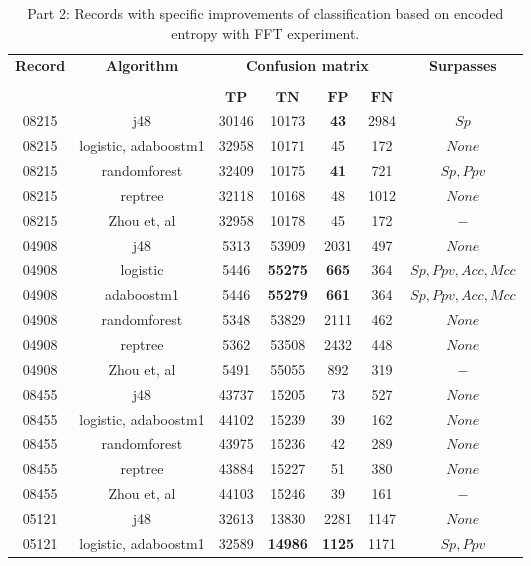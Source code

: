 \begin{table}[h]
\begin{center}
\begin{threeparttable}
\caption{Part 2: Records with specific improvements of classification based on encoded entropy with FFT experiment.}
\label{table:encoded_fft_2}
\scriptsize
  \begin{tabular}{c c c c c c c}
  \toprule
  \textbf{Record} & \textbf{Algorithm} & \multicolumn{4}{c}{\textbf{Confusion matrix}} & \textbf{Surpasses}\\
  \cline{3-6}
  \\
  & & $\mathbf{TP}$ & $\mathbf{TN}$ & $\mathbf{FP}$ & $\mathbf{FN}$\\
  \midrule  
    08215 & j48 & 30146 & 10173 & \textbf{43} & 2984 & $Sp$ \\
    08215 & logistic, adaboostm1 & 32958 & 10171 & 45 & 172 & $None$ \\
    08215 & randomforest & 32409 & 10175 & \textbf{41} & 721 & $Sp, Ppv$ \\
    08215 & reptree & 32118 & 10168 & 48 & 1012 & $None$ \\
    08215 & Zhou et, al & 32958 & 10178 & 45 & 172 & $-$ \\
    \hline
    04908 & j48 & 5313 & 53909 & 2031 & 497 & $None$ \\
    04908 & logistic & 5446 & \textbf{55275} & \textbf{665} & 364 & $Sp, Ppv, Acc, Mcc$ \\
    04908 & adaboostm1 & 5446 & \textbf{55279} & \textbf{661} & 364 & $Sp, Ppv, Acc, Mcc$ \\
    04908 & randomforest & 5348 & 53829 & 2111 & 462 & $None$ \\
    04908 & reptree & 5362 & 53508 & 2432 & 448 & $None$ \\
    04908 & Zhou et, al & 5491 & 55055 & 892 & 319 & $-$ \\
    \hline
    08455 & j48 & 43737 & 15205 & 73 & 527 & $None$ \\
    08455 & logistic, adaboostm1 & 44102 & 15239 & 39 & 162 & $None$ \\
    08455 & randomforest & 43975 & 15236 & 42 & 289 & $None$ \\
    08455 & reptree & 43884 & 15227 & 51 & 380 & $None$ \\
    08455 & Zhou et, al & 44103 & 15246 & 39 & 161 & $-$ \\
    \hline
    05121 & j48 & 32613 & 13830 & 2281 & 1147 & $None$ \\
    05121 & logistic, adaboostm1 & 32589 & \textbf{14986} & \textbf{1125} & 1171 & $Sp, Ppv$ \\

\end{tabular}
\end{threeparttable}
\end{center}
\end{table}
